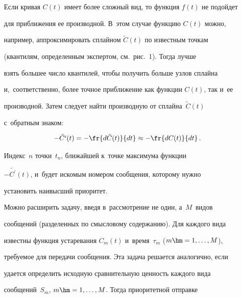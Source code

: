   


  Если кривая $C(t)$ имеет более слож\-ный вид, то функция $f(t)$ не подойдет 


для при\-бли\-же\-ния ее производной. В~этом случае функцию $C(t)$ мож\-но, 


например, аппроксимировать сплай\-ном $\tilde{C}(t)$ по известным точ\-кам 


(квантилям, определенным экспертом,  см.\ рис.~1). Тогда лучше 


взять большее чис\-ло квантилей, чтобы получить больше узлов сплай\-на 


и,~соответственно, более точ\-ное при\-бли\-же\-ние как функции $C(t)$, так и~ее 


производной. Затем следует найти производную от сплай\-на~$\tilde{C}(t)$ 


с~обрат\-ным знаком: 





\noindent


  $$


  -\tilde{C^\prime}(t) = -\fr{d\tilde{C}(t)}{dt}\approx - \fr{dC(t)}{dt}\,.


  $$


  


  \vspace*{-2pt}


  


  \noindent


   Индекс~$n$ точки~$t_n$, ближайшей к~точке максимума функции  


$-\tilde{C^\prime}(t)$, и~будет искомым номером сообщения, которому нужно 


установить наивысший приоритет.


  


  Можно расширить задачу, введя в~рас\-смот\-ре\-ние не один, а~$M$~видов 


сообщений (разделенных по смыс\-ло\-во\-му содержанию). Для каждого вида 


известны функция устаревания $C_m(t)$ и~время~$\tau_m$ ($m\hm= 1,\ldots , M$), 


тре\-бу\-емое для передачи сообщения. Эта задача решается аналогично, если 


удается определить исходную сравнительную цен\-ность каждого вида 


сообщений~$S_m$, $m\hm= 1,\ldots , M$. Тогда приоритетной отправке 


